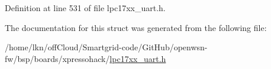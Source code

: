 Definition at line 531 of file lpc17xx\+\_\+uart.\+h.



The documentation for this struct was generated from the following file\+:\begin{DoxyCompactItemize}
\item 
/home/lkn/off\+Cloud/\+Smartgrid-\/code/\+Git\+Hub/openwsn-\/fw/bsp/boards/xpressohack/\hyperlink{lpc17xx__uart_8h}{lpc17xx\+\_\+uart.\+h}\end{DoxyCompactItemize}
